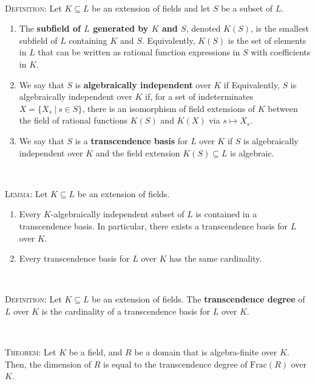 \documentclass[12pt]{amsart}
\newcommand{\0}{$\phantom{.}$}
\newcommand{\1}{\mathbbm{1}}
\begin{document}
\

	\noindent	\textsc{Definition:} Let $K\subseteq L$ be an extension of fields and let $S$ be a subset of $L$.
	\begin{enumerate}
	\item The \textbf{subfield of $L$ generated by $K$ and $S$}, denoted $K(S)$, is the smallest subfield of $L$ containing $K$ and $S$. Equivalently, $K(S)$ is the set of elements in $L$ that can be written as rational function expressions in $S$ with coefficients in $K$.
	\item We say that $S$ is \textbf{algebraically independent} over $K$ if 
	Equivalently, $S$ is algebraically independent over $K$ if, for a set of indeterminates $X=\{X_s \ | \ s\in S\}$, there is an isomorphism of field extensions of $K$ between the field of rational functions $K(S)$ and $K(X)$ via $s\mapsto X_s$.
	\item We say that $S$ is a \textbf{transcendence basis} for $L$ over $K$ if $S$ is algebraically independent over $K$ and the field extension $K(S) \subseteq L$ is algebraic.
	\end{enumerate}
	
	\
	
	\noindent \textsc{Lemma:} Let $K\subseteq L$ be an extension of fields.
\begin{enumerate}
\item Every $K$-algebraically independent subset of $L$ is contained in a transcendence basis. In particular, there exists a transcendence basis for $L$ over $K$.
\item Every transcendence basis for $L$ over $K$ has the same cardinality.
\end{enumerate}
	
	\
	
\noindent	\textsc{Definition:} Let $K\subseteq L$ be an extension of fields. The \textbf{transcendence degree} of $L$ over $K$ is the cardinality of a transcendence basis for $L$ over $K$.
	

	\
	
\noindent	\textsc{Theorem:} Let $K$ be a field, and $R$ be a domain that is algebra-finite over $K$. Then, the dimension of $R$ is equal to the transcendence degree of $\mathrm{Frac}(R)$ over $K$.


\begin{comment}


\end{comment}
\end{document}
